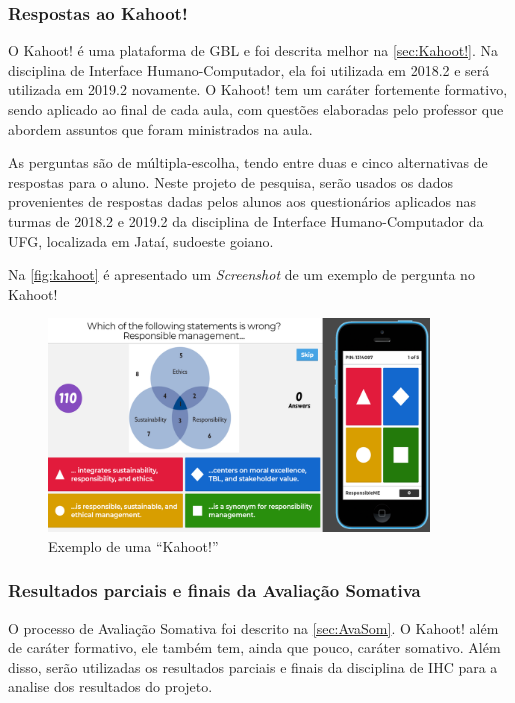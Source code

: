 \documentclass[
	12pt,				%
	openright,			%
	oneside,
	a4paper,			%
	english,			%
	french,				%
	spanish,			%
	brazil,				%
	]{abntex2}
\begin{document}
\subsubsection{Respostas ao Kahoot!}
O Kahoot! é uma plataforma de GBL e foi descrita melhor na \autoref{sec:Kahoot!}. Na disciplina de Interface Humano-Computador, ela foi utilizada em 2018.2 e será utilizada em 2019.2 novamente. O Kahoot! tem um caráter fortemente formativo, sendo aplicado ao final de cada aula, com questões elaboradas pelo professor que abordem assuntos que foram ministrados na aula. 

As perguntas são de múltipla-escolha, tendo entre duas e cinco alternativas de respostas para o aluno. Neste projeto de pesquisa, serão usados os dados provenientes de respostas dadas pelos alunos aos questionários aplicados nas turmas de 2018.2 e 2019.2 da disciplina de Interface Humano-Computador da UFG, localizada em Jataí, sudoeste goiano.

Na \autoref{fig:kahoot} é apresentado um \textit{Screenshot} de um exemplo de pergunta no Kahoot!

\begin{figure}
    \centering
    \includegraphics[width=0.9\textwidth]{Modelo_Projeto_Pesquisa_UFG_REJ_BCC/KahootScreenshot.png}
    \caption{Exemplo de uma ``Kahoot!''}
    \label{fig:kahoot}
\end{figure}

\subsubsection{Resultados parciais e finais da Avaliação Somativa}

O processo de Avaliação Somativa foi descrito na \autoref{sec:AvaSom}. O Kahoot! além de caráter formativo, ele também tem, ainda que pouco, caráter somativo. Além disso, serão utilizadas os resultados parciais e finais da disciplina de IHC para a analise dos resultados do projeto.
\end{document}
